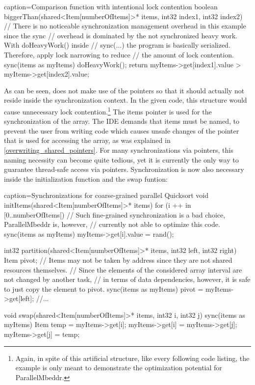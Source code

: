 \vspace{4mm}
\begin{ccode}{caption=Comparison function with intentional lock contention}{}
boolean biggerThan(shared<Item[numberOfItems]>* items, int32 index1, int32 index2) { 
  // There is no noticeable synchronization management overhead in this example since the sync 
  // overhead is dominated by the not synchronized heavy work. With doHeavyWork() inside 
  // sync(...) the program is basically serialized. Therefore, apply lock narrowing to reduce 
  // the amount of lock contention. 
  sync(items as myItems) { 
    doHeavyWork(); 
    return myItems->get[index1].value > myItems->get[index2].value; 
  }
}
\end{ccode}
As can be seen,  does not make use of the  pointers so that it should actually not reside inside the synchronization context. In the given code, this structure would cause unnecessary lock contention.\footnote{Again, in spite of this artificial structure, like every following code listing, the example is only meant to demonstrate the optimization potential for ParallelMbeddr.} The items pointer is used for the synchronization of the array. The IDE demands that items must be named, to prevent the user from writing code which causes unsafe changes of the pointer that is used for accessing the array, as was explained in \ref{overwriting_shared_pointers}. For many synchronizations via pointers, this naming necessity can become quite tedious, yet it is currently the only way to guarantee thread-safe access via pointers. Synchronization is now also necessary inside the initialization function and the swap funtion:
\begin{ccode}{caption=Synchronizations for coarse-grained parallel Quicksort}
void initItems(shared<Item[numberOfItems]>* items) { 
  for (i ++ in [0..numberOfItems[) {
    // Such fine-grained synchronization is a bad choice, ParallelMbeddr is, however,
    // currently not able to optimize this code.
    sync(items as myItems) { myItems->get[i].value = rand(); } 
  }
}

int32 partition(shared<Item[numberOfItems]>* items, int32 left, int32 right) { 
  Item pivot;
  // Items may not be taken by address since they are not shared resources themselves.
  // Since the elements of the considered array interval are not changed by another task,
  // in terms of data dependencies, however, it is safe to just copy the element to pivot.
  sync(items as myItems) { pivot = myItems->get[left]; } 
  //...
}

void swap(shared<Item[numberOfItems]>* items, int32 i, int32 j) { 
  sync(items as myItems) { 
    Item temp = myItems->get[i]; 
    myItems->get[i] = myItems->get[j]; 
    myItems->get[j] = temp; 
  } 
}
\end{ccode}

